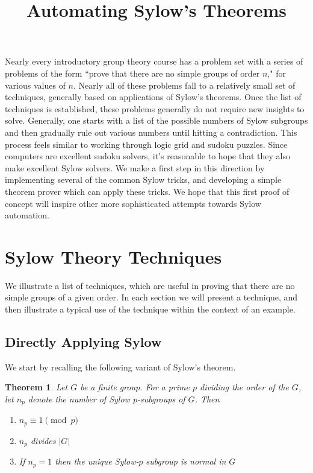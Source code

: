 \documentclass[11pt,
oneside]{article} %
\title{Automating Sylow's Theorems}
\newtheorem{theorem}{Theorem}
\begin{document}
\maketitle

Nearly every introductory group theory course has a problem set with a
series of problems of the form ``prove that there are no simple groups
of order $n$," for various values of $n$.  Nearly all of these
problems fall to a relatively small set of techniques, generally based
on applications of Sylow's theorems.  Once the list of techniques is
established, these problems generally do not require new insights to
solve.  Generally, one starts with a list of the possible numbers of
Sylow subgroups and then gradually rule out various numbers until
hitting a contradiction.  This process feels similar to working
through logic grid and sudoku puzzles.  Since computers are excellent
sudoku solvers, it's reasonable to hope that they also make excellent
Sylow solvers.  We make a first step in this direction by implementing
several of the common Sylow tricks, and developing a simple theorem
prover which can apply these tricks.  We hope that this first proof of
concept will inspire other more sophisticated attempts towards Sylow
automation.

\section{Sylow Theory Techniques}

We illustrate a list of techniques, which are useful in proving that
there are no simple groups of a given order.  In each section we will
present a technique, and then illustrate a typical use of the
technique within the context of an example.

\subsection{Directly Applying Sylow}

We start by recalling the following variant of Sylow's theorem.

\begin{theorem}
Let $G$ be a finite group.  For a prime $p$ dividing the order of the $G$, let $n_p$ denote the number of Sylow $p$-subgroups of $G$. Then
\begin{enumerate}
\item $n_p \equiv 1 \pmod p$
\item $n_p$ divides $|G|$
\item If $n_p = 1$ then the unique Sylow-$p$ subgroup is normal in $G$ 
\end{enumerate}
\end{theorem}
\end{document}
